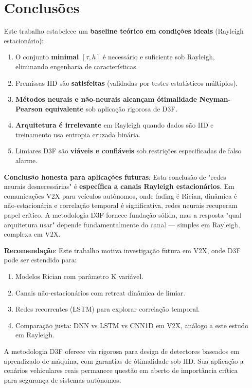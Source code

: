 \documentclass{sbrt}
\begin{document}
\section{Conclusões}

Este trabalho estabelece um \textbf{baseline teórico em condições ideais} (Rayleigh estacionário):

\begin{enumerate}
\item O conjunto \textbf{minimal $[\tau, h]$} é necessário e suficiente sob Rayleigh, eliminando engenharia de características.
\item Premissas IID são \textbf{satisfeitas} (validadas por testes estatísticos múltiplos).
\item \textbf{Métodos neurais e não-neurais alcançam ótimalidade Neyman-Pearson equivalente} sob aplicação rigorosa de D3F.
\item \textbf{Arquitetura é irrelevante} em Rayleigh quando dados são IID e treinamento usa entropia cruzada binária.
\item Limiares D3F são \textbf{viáveis e confiáveis} sob restrições especificadas de falso alarme.
\end{enumerate}

\textbf{Conclusão honesta para aplicações futuras}: Esta conclusão de "redes neurais desnecessárias" é \textbf{específica a canais Rayleigh estacionários}. Em comunicações V2X para veículos autônomos, onde fading é Rician, dinâmica é não-estacionária e correlação temporal é significativa, redes neurais recuperam papel crítico. A metodologia D3F fornece fundação sólida, mas a resposta "qual arquitetura usar" depende fundamentalmente do canal --- simples em Rayleigh, complexa em V2X.

\textbf{Recomendação}: Este trabalho motiva investigação futura em V2X, onde D3F pode ser estendido para:
\begin{enumerate}
\item Modelos Rician com parâmetro K variável.
\item Canais não-estacionários com retreat dinâmica de limiar.
\item Redes recorrentes (LSTM) para explorar correlação temporal.
\item Comparação justa: DNN vs LSTM vs CNN1D em V2X, análogo a este estudo em Rayleigh.
\end{enumerate}

A metodologia D3F oferece via rigorosa para design de detectores baseados em aprendizado de máquina, com garantias de ótimalidade sob IID. Sua aplicação a cenários vehiculares reais permanece questão em aberto de importância crítica para segurança de sistemas autônomos.
\end{document}
